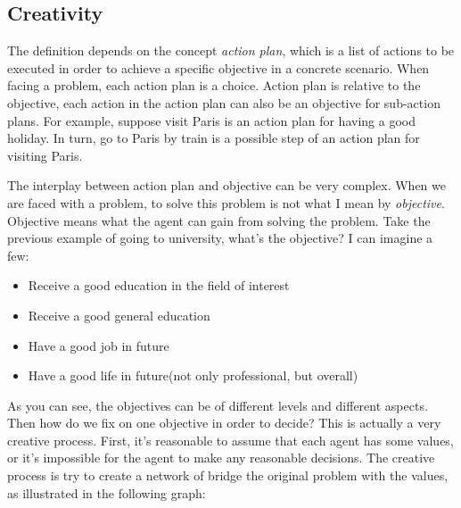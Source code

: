 
\subsection{Creativity}

The definition depends on the concept \emph{action plan}, which is a list of actions to be executed in order to achieve a specific objective in a concrete scenario. When facing a problem, each action plan is a choice. Action plan is relative to the objective, each action in the action plan can also be an objective for sub-action plans. For example, suppose visit Paris is an action plan for having a good holiday. In turn, go to Paris by train is a possible step of an action plan for visiting Paris.

The interplay between action plan and objective can be very complex. When we are faced with a problem, to solve this problem is not what I mean by \emph{objective}. Objective means what the agent can gain from solving the problem. Take the previous example of going to university, what's the objective? I can imagine a few:

\begin{itemize}
\item Receive a good education in the field of interest
\item Receive a good general education
\item Have a good job in future
\item Have a good life in future(not only professional, but overall)
\end{itemize}

As you can see, the objectives can be of different levels and different aspects. Then how do we fix on one objective in order to decide? This is actually a very creative process. First, it's reasonable to assume that each agent has some values, or it's impossible for the agent to make any reasonable decisions. The creative process is try to create a network of bridge the original problem with the values, as illustrated in the following graph:


